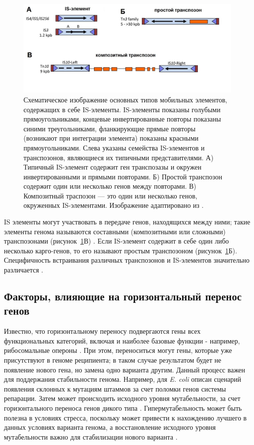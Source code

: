\begin{figure}[!ht] 
  \center
  \includegraphics [width=\textwidth] {Dissertation/images/lit/trans.jpg}
  \caption{Схематическое изображение основных типов мобильных элементов, содержащих в себе IS-элементы. IS-элементы показаны голубыми прямоугольниками, концевые инвертированные повторы показаны синими треугольниками, фланкирующие прямые повторы (возникают при интеграции элемента) показаны красными прямоугольниками. Слева указаны семейства IS-элементов и транспозонов, являющиеся их типичными представителями. А) Типичный IS-элемент содержит ген транспозазы и окружен инвертированными и прямыми повторами. Б) Простой транспозон содержит один или несколько генов между повторами. В) Композитный траспозон --- это один или несколько генов, окруженных IS-элементами. Изображение адаптировано из \cite{siguier2015everyman}.} 
  \label{img:transposone}  
\end{figure}

IS элементы могут участвовать в передаче генов, находящихся между ними; такие элементы генома называются составными (композитными или сложными) транспозонами (рисунок~\ref{img:transposone}В) \cite{alton1979nucleotide}. Если IS-элемент содержит в себе один либо несколько карго-генов, то его называют простым транспозоном (рисунок~\ref{img:transposone}Б).  Специфичность встраивания различных транспозонов и IS-элементов значительно различается \cite{wilde2003transposases}.

\subsection{Факторы, влияющие на горизонтальный перенос генов}
Известно, что горизонтальному переносу подвергаются гены всех функциональных категорий, включая и наиболее базовые функции - например, рибосомальные опероны \cite{gogarten2002prokaryotic}. При этом, переноситься могут гены, которые уже присутствуют в геноме реципиента; в таком случае результатом будет не появление нового гена, но замена одно варианта другим. Данный процесс важен для поддержания стабильности генома. Например, для \textit{E. coli} описан сценарий появления склонных к мутациям штаммов за счет поломки генов системы репарации. Затем может происходить исходного уровня мутабельности, за счет горизонтального переноса генов дикого типа \cite{brown2001phylogenetic}. Гипермутабельность может быть полезна в условиях стресса, поскольку может привести к нахождению лучшего в данных условиях варианта генома, а восстановление исходного уровня мутабельности важно для стабилизации нового варианта \cite{caporale2006implicit}.

